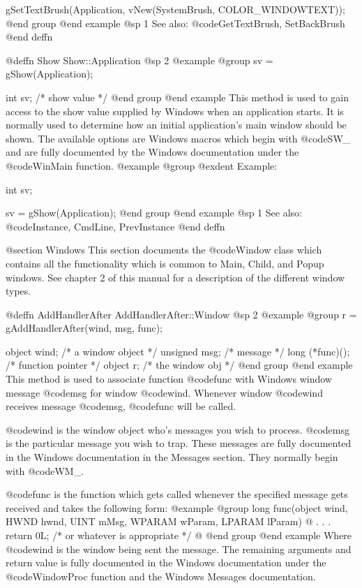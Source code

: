 gSetTextBrush(Application, vNew(SystemBrush, COLOR_WINDOWTEXT));
@end group
@end example
@sp 1
See also:  @code{GetTextBrush, SetBackBrush}
@end deffn










@deffn {Show} Show::Application
@sp 2
@example
@group
sv = gShow(Application);

int     sv;     /*  show value   */
@end group
@end example
This method is used to gain access to the show value supplied by Windows
when an application starts.  It is normally used to determine how an
initial application's main window should be shown.  The available
options are Windows macros which begin with @code{SW_} and are fully
documented by the Windows documentation under the @code{WinMain}
function.
@example
@group
@exdent Example:

int     sv;

sv = gShow(Application);
@end group
@end example
@sp 1
See also:  @code{Instance, CmdLine, PrevInstance}
@end deffn









@section Windows
This section documents the @code{Window} class which contains all the
functionality which is common to Main, Child, and Popup windows.  See
chapter 2 of this manual for a description of the different window
types.






@deffn {AddHandlerAfter} AddHandlerAfter::Window
@sp 2
@example
@group
r = gAddHandlerAfter(wind, msg, func);

object   wind;     /*  a window object  */
unsigned msg;      /*  message          */
long    (*func)(); /*  function pointer */
object  r;         /*  the window obj   */
@end group
@end example
This method is used to associate function @code{func} with Windows window
message @code{msg} for window @code{wind}.  Whenever window @code{wind}
receives message @code{msg}, @code{func} will be called.

@code{wind} is the window object who's messages you wish to process.
@code{msg} is the particular message you wish to trap.  These messages
are fully documented in the Windows documentation in the Messages
section.  They normally begin with @code{WM_}.

@code{func} is the function which gets called whenever the specified
message gets received and takes the following form:
@example
@group
long    func(object     wind,
             HWND       hwnd, 
             UINT       mMsg, 
             WPARAM     wParam, 
             LPARAM     lParam)
@{
        .
        .
        .
        return 0L;  /* or whatever is appropriate  */
@}
@end group
@end example
Where @code{wind} is the window being sent the message.  The remaining
arguments and return value is fully documented in the Windows documentation
under the @code{WindowProc} function and the Windows Messages documentation.


